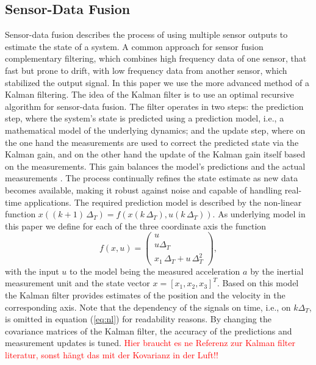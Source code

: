 \documentclass[engproc,conferenceproceedings,submit,pdftex,moreauthors]{Definitions/mdpi}
\begin{document}
\subsection{Sensor-Data Fusion}
Sensor-data fusion describes the process of using multiple sensor outputs to estimate the state of a system. A common approach for sensor fusion complementary filtering, which combines high frequency data of one sensor, that fast but prone to drift, with low frequency data from another sensor, which stabilized the output signal.
In this paper we use the more advanced method of a Kalman filtering. The idea of the Kalman filter is to use an optimal recursive algorithm  for sensor-data fusion. The filter operates in two steps: the prediction step, where the system's state  is predicted using a prediction model, i.e., a mathematical model of the underlying dynamics; and the update step, where on the one hand the measurements are used to correct the predicted state via the Kalman gain, and on the other hand the update of the Kalman gain itself based on the measurements. This gain balances the model's predictions and the actual measurements \cite{chui2009}. The process continually refines the state estimate as new data becomes available, making it robust against noise and capable of handling real-time applications. The required prediction model is described by  the non-linear function $x((k+1)\,\Delta_T) = f(x(k\,\Delta_T),u(k\,\Delta_T))$. As underlying model in this paper we define for each of the three coordinate  axis the function 
\begin{equation}\label{eq:nl}
	f(x,u) = \begin{pmatrix}
		u \\
		u \Delta_T   \\
		x_1 \, \Delta_T   + u \, \Delta_T^2  
	\end{pmatrix},
\end{equation}
with the input $u$ to the model being the measured acceleration $a$ by the inertial measurement unit and the state vector $x = [x_1, x_2, x_3]^T$. Based on this model the Kalman filter provides estimates of the position and the velocity in the corresponding axis.  
Note that the dependency of the signals on time, i.e., on $k\Delta_T$, is omitted in equation (\ref{eq:nl}) for readability reasons.
By changing the covariance matrices of the Kalman filter, the accuracy of the predictions and measurement updates is tuned. \textcolor{red}{Hier braucht es ne Referenz zur Kalman filter literatur, sonst hängt das mit der Kovarianz in der Luft!!} \\
\end{document}
